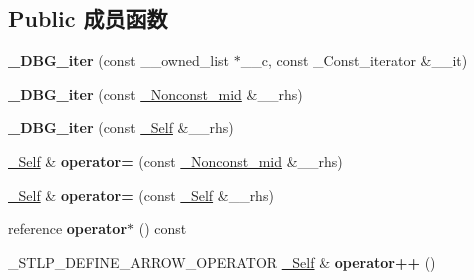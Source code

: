 \subsection*{Public 成员函数}
\begin{DoxyCompactItemize}
\item 
\mbox{\label{struct___d_b_g__iter_acf24c3a2e14253e7800a392b636cc6e7}} 
{\bfseries \+\_\+\+D\+B\+G\+\_\+iter} (const \+\_\+\+\_\+owned\+\_\+list $\ast$\+\_\+\+\_\+c, const \+\_\+\+Const\+\_\+iterator \&\+\_\+\+\_\+it)
\item 
\mbox{\label{struct___d_b_g__iter_a2f606fb6fc173cddc945f368e44514ee}} 
{\bfseries \+\_\+\+D\+B\+G\+\_\+iter} (const \hyperlink{struct___d_b_g__iter__mid}{\+\_\+\+Nonconst\+\_\+mid} \&\+\_\+\+\_\+rhs)
\item 
\mbox{\label{struct___d_b_g__iter_aaf8cb26a638ea6ab2a35a11deb7189f5}} 
{\bfseries \+\_\+\+D\+B\+G\+\_\+iter} (const \hyperlink{struct___d_b_g__iter}{\+\_\+\+Self} \&\+\_\+\+\_\+rhs)
\item 
\mbox{\label{struct___d_b_g__iter_a290b42f5b5da1635a3a38e3deb2af134}} 
\hyperlink{struct___d_b_g__iter}{\+\_\+\+Self} \& {\bfseries operator=} (const \hyperlink{struct___d_b_g__iter__mid}{\+\_\+\+Nonconst\+\_\+mid} \&\+\_\+\+\_\+rhs)
\item 
\mbox{\label{struct___d_b_g__iter_a76af6f8572943f86b5f7c3373fba4db3}} 
\hyperlink{struct___d_b_g__iter}{\+\_\+\+Self} \& {\bfseries operator=} (const \hyperlink{struct___d_b_g__iter}{\+\_\+\+Self} \&\+\_\+\+\_\+rhs)
\item 
\mbox{\label{struct___d_b_g__iter_a404088a15aca90698bb6cd01c31cf9d1}} 
reference {\bfseries operator$\ast$} () const
\item 
\mbox{\label{struct___d_b_g__iter_a1c5bdf039606a54b760f21e44cbaa005}} 
\+\_\+\+S\+T\+L\+P\+\_\+\+D\+E\+F\+I\+N\+E\+\_\+\+A\+R\+R\+O\+W\+\_\+\+O\+P\+E\+R\+A\+T\+OR \hyperlink{struct___d_b_g__iter}{\+\_\+\+Self} \& {\bfseries operator++} ()
\item 
\mbox{\label{struct___d_b_g__iter_a81ad45cebce67c9e5ac50c107f500f5e}} 

\end{DoxyCompactItemize}

